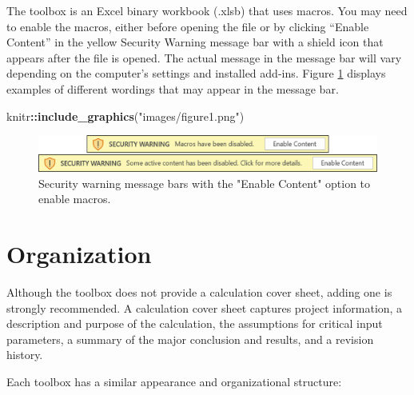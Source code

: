 \documentclass[
]{book}
\newenvironment{Shaded}{\begin{snugshade}}{\end{snugshade}}
\newcommand{\FunctionTok}[1]{\textcolor[rgb]{0.13,0.29,0.53}{\textbf{#1}}}
\newcommand{\NormalTok}[1]{#1}
\newcommand{\SpecialCharTok}[1]{\textcolor[rgb]{0.81,0.36,0.00}{\textbf{#1}}}
\newcommand{\StringTok}[1]{\textcolor[rgb]{0.31,0.60,0.02}{#1}}
\begin{document}
The toolbox is an Excel binary workbook (.xlsb) that uses macros. You may need to enable the macros, either before opening the file or by clicking ``Enable Content'' in the yellow Security Warning message bar with a shield icon that appears after the file is opened. The actual message in the message bar will vary depending on the computer's settings and installed add-ins. Figure \ref{fig:figure-1} displays examples of different wordings that may appear in the message bar.

\begin{Shaded}
\begin{Highlighting}[]
\NormalTok{knitr}\SpecialCharTok{::}\FunctionTok{include\_graphics}\NormalTok{(}\StringTok{"images/figure1.png"}\NormalTok{)}
\end{Highlighting}
\end{Shaded}

\begin{figure}

{\centering \includegraphics{images/figure1} 

}

\caption{Security warning message bars with the "Enable Content" option to enable macros.}\label{fig:figure-1}
\end{figure}

\section{Organization}\label{organization}

Although the toolbox does not provide a calculation cover sheet, adding one is strongly recommended. A calculation cover sheet captures project information, a description and purpose of the calculation, the assumptions for critical input parameters, a summary of the major conclusion and results, and a revision history.

Each toolbox has a similar appearance and organizational structure:
\end{document}
